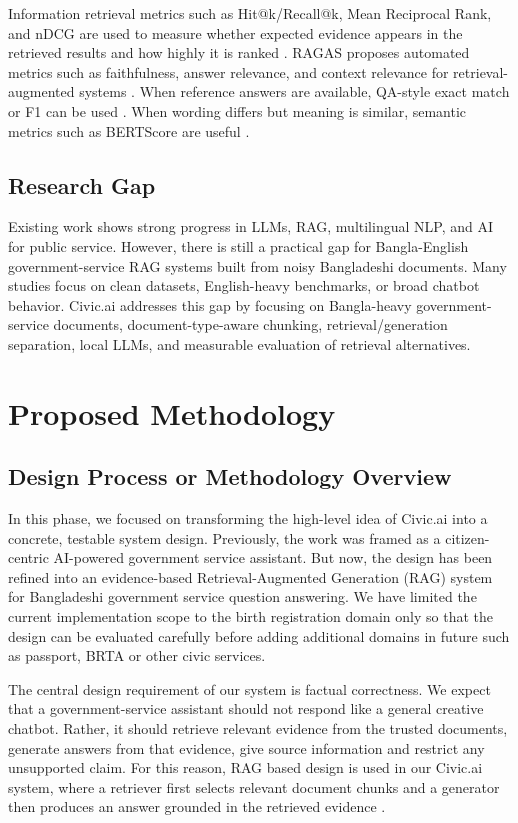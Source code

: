 \documentclass[12pt,oneside,openany]{report}
\begin{document}
Information retrieval metrics such as Hit@k/Recall@k, Mean Reciprocal Rank, and nDCG are used to measure whether expected evidence appears in the retrieved results and how highly it is ranked \cite{manning2008ir,voorhees1999trec8qa,jarvelin2002ndcg}. RAGAS proposes automated metrics such as faithfulness, answer relevance, and context relevance for retrieval-augmented systems \cite{es2024ragas}. When reference answers are available, QA-style exact match or F1 can be used \cite{rajpurkar2016squad}. When wording differs but meaning is similar, semantic metrics such as BERTScore are useful \cite{zhang2020bertscore}.

\section{Research Gap}
Existing work shows strong progress in LLMs, RAG, multilingual NLP, and AI for public service. However, there is still a practical gap for Bangla-English government-service RAG systems built from noisy Bangladeshi documents. Many studies focus on clean datasets, English-heavy benchmarks, or broad chatbot behavior. Civic.ai addresses this gap by focusing on Bangla-heavy government-service documents, document-type-aware chunking, retrieval/generation separation, local LLMs, and measurable evaluation of retrieval alternatives.

\chapter{Proposed Methodology}
\section{Design Process or Methodology Overview}

In this phase, we focused on transforming the high-level idea of Civic.ai into a concrete, testable system design. Previously, the work was framed as a citizen-centric AI-powered government service assistant. But now, the design has been refined into an evidence-based Retrieval-Augmented Generation (RAG) system for Bangladeshi government service question answering. We have limited the current implementation scope to the birth registration domain only so that the design can be evaluated carefully before adding additional domains in future such as passport, BRTA or other civic services.

The central design requirement of our system is factual correctness. We expect that a government-service assistant should not respond like a general creative chatbot. Rather, it should retrieve relevant evidence from the trusted documents, generate answers from that evidence, give source information and restrict any unsupported claim. For this reason, RAG based design is used in our Civic.ai system, where a retriever first selects relevant document chunks and a generator then produces an answer grounded in the retrieved evidence \cite{lewis2020rag}.
\end{document}
